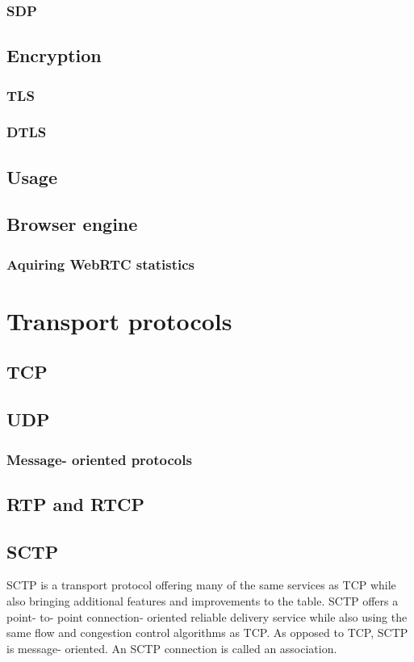\documentclass[UKenglish]{ifimaster}
\begin{document}
\subsubsection{SDP}
\subsection{Encryption}
\subsubsection{TLS}
\subsubsection{DTLS}
\subsection{Usage}
\subsection{Browser engine}
\subsubsection{Aquiring WebRTC statistics}

\section{Transport protocols}
\subsection{TCP}
\subsection{UDP}
\subsubsection{Message- oriented protocols}
\subsection{RTP and RTCP}
\subsection{SCTP}
SCTP is a transport protocol offering many of the same services as TCP while also bringing additional features and improvements to the table. 
SCTP offers a point- to- point connection- oriented reliable delivery service while also using the same flow and congestion control algorithms as TCP.   %
As opposed to TCP, SCTP is message- oriented. %
An SCTP connection is called an association.
\end{document}

